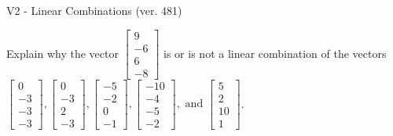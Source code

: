 \begin{exercise}
  \begin{exerciseTitle}V2 - Linear Combinations (ver. 481)\end{exerciseTitle}
  \begin{exerciseStatement}
    Explain why the vector \(\left[\begin{array}{c}
9 \\
-6 \\
6 \\
-8
\end{array}\right]\)  is or is not a linear 
	combination of the vectors \(\left[\begin{array}{c}
0 \\
-3 \\
-3 \\
-3
\end{array}\right] , \left[\begin{array}{c}
0 \\
-3 \\
2 \\
-3
\end{array}\right] , \left[\begin{array}{c}
-5 \\
-2 \\
0 \\
-1
\end{array}\right] , \left[\begin{array}{c}
-10 \\
-4 \\
-5 \\
-2
\end{array}\right] , \text{ and } \left[\begin{array}{c}
5 \\
2 \\
10 \\
1
\end{array}\right]\).
	



\end{exerciseStatement}
\end{exercise}
